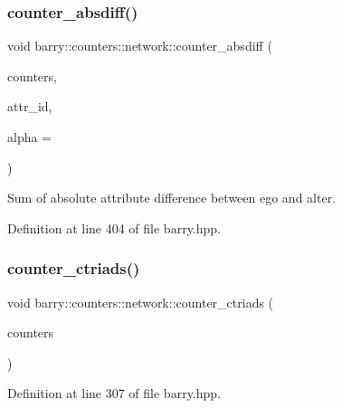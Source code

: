 \subsubsection{\texorpdfstring{counter\+\_\+absdiff()}{counter\_absdiff()}}
{\footnotesize\ttfamily void barry\+::counters\+::network\+::counter\+\_\+absdiff (\begin{DoxyParamCaption}\item[{\hyperlink{namespacebarry_1_1counters_1_1network_aa72fdb34752ac24167a06ee196a8fff6}{Net\+Counters} $\ast$}]{counters,  }\item[{\hyperlink{namespacebarry_a11dfc53ddb4672278319aa04f1e09a6c}{uint}}]{attr\+\_\+id,  }\item[{double}]{alpha = {} }\end{DoxyParamCaption})\hspace{0.3cm}{\ttfamily [inline]}}



Sum of absolute attribute difference between ego and alter. 



Definition at line 404 of file barry.\+hpp.

\mbox{\label{namespacebarry_1_1counters_1_1network_af04b15d38a744b0e741005c44b581368}} 
\subsubsection{\texorpdfstring{counter\+\_\+ctriads()}{counter\_ctriads()}}
{\footnotesize\ttfamily void barry\+::counters\+::network\+::counter\+\_\+ctriads (\begin{DoxyParamCaption}\item[{\hyperlink{namespacebarry_1_1counters_1_1network_aa72fdb34752ac24167a06ee196a8fff6}{Net\+Counters} $\ast$}]{counters }\end{DoxyParamCaption})\hspace{0.3cm}{\ttfamily [inline]}}



Definition at line 307 of file barry.\+hpp.

\mbox{\label{namespacebarry_1_1counters_1_1network_a3d7953d9b68c547fc0d02cc1f6fadb23}} 
